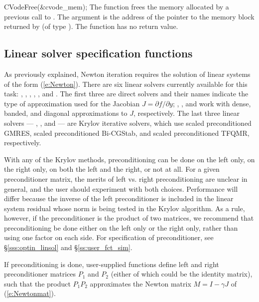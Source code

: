 {
  CVodeFree(\&cvode\_mem);
}
{
  The function  frees the memory allocated by
  a previous call to .
}
{
  The argument is the address of the pointer to the {\cvode} memory block
  returned by  (of type ).
}
{
  The function  has no return value.
}
{}
\subsection{Linear solver specification functions}\label{sss:lin_solv_init}

As previously explained, Newton iteration requires the solution of
linear systems of the form (\ref{e:Newton}).  There are six {\cvode} linear
solvers currently available for this task: {\cvdense}, {\cvband}, {\cvdiag},
{\cvspgmr}, {\cvspbcg}, and {\cvsptfqmr}.  The first three are direct solvers
and their names indicate the type of approximation used for the Jacobian 
$J = \partial{f}/\partial{y}$; {\cvdense}, {\cvband}, and {\cvdiag} work with
dense, banded, and diagonal approximations to $J$, respectively.  The last
three {\cvode} linear solvers --- {\cvspgmr}, {\cvspbcg}, and {\cvsptfqmr} ---
are Krylov iterative solvers, which use scaled preconditioned GMRES, scaled
preconditioned Bi-CGStab, and scaled preconditioned TFQMR, respectively.

With any of the Krylov methods, preconditioning 
can be done on the left only, on the right only, on both the left and the right, 
or not at all.  For a given preconditioner matrix, the merits of left vs. right
preconditioning are unclear in general, and the user should experiment
with both choices.  Performance will differ because the inverse of the
left preconditioner is included in the linear system residual whose
norm is being tested in the Krylov algorithm.  As a rule, however, if
the preconditioner is the product of two matrices, we recommend that
preconditioning be done either on the left only or the right only,
rather than using one factor on each side. For specification of preconditioner,
see \S\ref{sss:optin_linsol} and \S\ref{ss:user_fct_sim}.

If preconditioning is done, user-supplied functions define left and right 
preconditioner matrices $P_1$ and $P_2$ (either of which could be the identity
matrix), such that the product $P_1 P_2$ approximates the Newton matrix
$M = I - \gamma J$ of (\ref{e:Newtonmat}).

